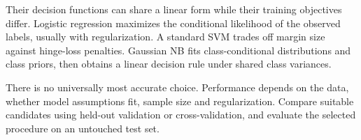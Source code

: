 Their decision functions can share a linear form while their training objectives differ. Logistic regression maximizes the conditional likelihood of the observed labels, usually with regularization. A standard SVM trades off margin size against hinge-loss penalties. Gaussian NB fits class-conditional distributions and class priors, then obtains a linear decision rule under shared class variances.


There is no universally most accurate choice. Performance depends on the data, whether model assumptions fit, sample size and regularization. Compare suitable candidates using held-out validation or cross-validation, and evaluate the selected procedure on an untouched test set.

